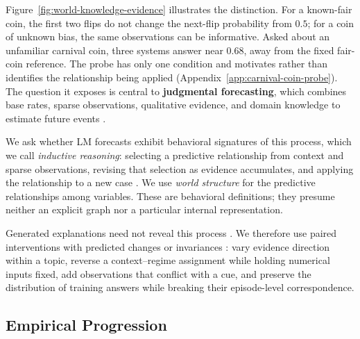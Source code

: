 Figure~\ref{fig:world-knowledge-evidence} illustrates the distinction. For a
known-fair coin, the first two flips do not change the next-flip probability from
$0.5$; for a coin of unknown bias, the same observations can be informative.
Asked about an unfamiliar carnival coin, three systems answer near $0.68$, away
from the fixed fair-coin reference. The probe has only one condition and motivates
rather than identifies the relationship being applied
(Appendix~\ref{app:carnival-coin-probe}). The question it exposes is central to
\textbf{judgmental forecasting}, which combines base rates, sparse observations,
qualitative evidence, and domain knowledge to estimate future events
\citep{mellers2014psychological,tetlock2016superforecasting}.


We ask whether LM forecasts exhibit behavioral signatures of this process, which
we call \emph{inductive reasoning}: selecting a predictive relationship from
context and sparse observations, revising that selection as evidence accumulates,
and applying the relationship to a new case
\citep{tenenbaum2006theory,griffiths2010probabilistic,lake2017building}.
We use \emph{world structure} for the predictive relationships among variables.
These are behavioral definitions; they presume neither an explicit graph nor a
particular internal representation.

Generated explanations need not reveal this process
\citep{jacovi2020towards,turpin2023language}. We therefore use paired interventions
with predicted changes or invariances \citep{ribeiro2020beyond,elazar2021measuring}:
vary evidence direction within a topic, reverse a context--regime assignment while
holding numerical inputs fixed, add observations that conflict with a cue, and
preserve the distribution of training answers while breaking their episode-level
correspondence.

\subsection{Empirical Progression}
\label{sec:forecasting-as-inductive}

